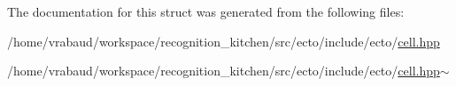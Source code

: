 The documentation for this struct was generated from the following files\-:\begin{DoxyCompactItemize}
\item 
/home/vrabaud/workspace/recognition\-\_\-kitchen/src/ecto/include/ecto/\hyperlink{cell_8hpp}{cell.\-hpp}\item 
/home/vrabaud/workspace/recognition\-\_\-kitchen/src/ecto/include/ecto/\hyperlink{cell_8hpp~}{cell.\-hpp$\sim$}\end{DoxyCompactItemize}
